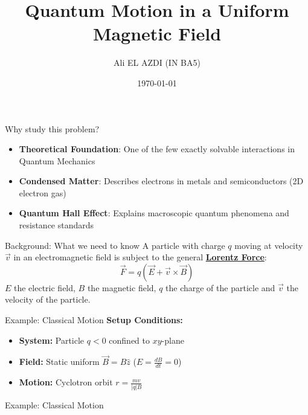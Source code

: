 \documentclass[aspectratio=169, 14pt, t]{beamer}
\title{Quantum Motion in a Uniform Magnetic Field}
\author{Ali EL AZDI (IN BA5)}
\date{\today}
\begin{document}
\begin{frame}[plain,c]
    \titlepage
\end{frame}

\begin{frame}{Why study this problem?}
    \vspace{0.5cm}
    \begin{itemize}
        \item \textbf{Theoretical Foundation}: One of the few exactly solvable interactions in Quantum Mechanics
        \item \textbf{Condensed Matter}: Describes electrons in metals and semiconductors (2D electron gas)
        \item \textbf{Quantum Hall Effect}: Explains macroscopic quantum phenomena and resistance standards
    \end{itemize}
\end{frame}

\begin{frame}{Background: What we need to know}
    A particle with charge $q$ moving at velocity $\vec{v}$ in an electromagnetic field is subject to the general \underline{\textbf{Lorentz Force}}:
    \vfill
    \[
        \vec{F} = q(\vec{E} + \vec{v} \times \vec{B})
    \]\vfill
    $E$ the electric field, $B$ the magnetic field, $q$ the charge of the particle and $\vec{v}$ the velocity of the particle.
\end{frame}

\begin{frame}{Example: Classical Motion}
    \textbf{Setup Conditions:}
    \vspace{0.5cm}
    \begin{itemize}
        \item \textbf{System:} Particle $q < 0$ confined to $xy$-plane
        \item \textbf{Field:} Static uniform $\vec{B} = B\hat{z}$ ($E=\frac{dB}{dt} = 0$)
        \item \textbf{Motion:} Cyclotron orbit $r = \frac{mv}{|q|B}$
    \end{itemize}
\end{frame}

\begin{frame}{Example: Classical Motion}
    \begin{center}
       
    \end{center}
\end{frame}
\end{document}
